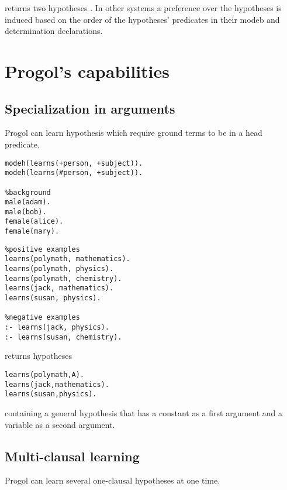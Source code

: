returns two hypotheses
. In other systems a preference over the hypotheses is induced based on the order of the hypotheses' predicates  in their modeb and determination declarations.

\section{Progol's capabilities}

\subsection{Specialization in arguments}
Progol can learn hypothesis which require ground terms to be in a head predicate.

\begin{minipage}[t]{.50\textwidth}
\begin{lstlisting}
modeh(learns(+person, +subject)).
modeh(learns(#person, +subject)).

%background
male(adam).
male(bob).
female(alice).
female(mary).
\end{lstlisting}
\end{minipage}
\begin{minipage}[t]{.20\textwidth}
\begin{lstlisting}
%positive examples
learns(polymath, mathematics).
learns(polymath, physics).
learns(polymath, chemistry).
learns(jack, mathematics).
learns(susan, physics).

%negative examples
:- learns(jack, physics).
:- learns(susan, chemistry).
\end{lstlisting}
\end{minipage}

returns hypotheses
\begin{lstlisting}
learns(polymath,A).
learns(jack,mathematics).
learns(susan,physics).
\end{lstlisting}
containing a general hypothesis  that has a constant  as a first argument and a variable as a second argument.

\subsection{Multi-clausal learning}
Progol can learn several one-clausal hypotheses at one time.

